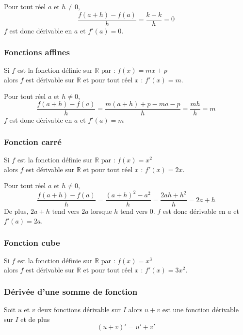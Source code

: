 \documentclass[french]{book}
\newcommand{\R}{\mathbb {R}}
\begin{document}
\begin{demo}
Pour tout réel $a$ et $h\neq 0$, 
\[\dfrac{f(a+h)-f(a)}{h}=\dfrac{k-k}{h}=0\]
$f$ est donc dérivable en $a$ et $f'(a)=0$.
\end{demo}

\subsubsection*{Fonctions affines}
\begin{prop}
Si $f$ est la fonction définie sur $\R$ par :  $f(x)=mx+p$ \\
alors $f$ est dérivable sur $\R$ et pour tout réel $x$ :  $f'(x)=m$.
\end{prop}

\begin{demo}
Pour tout réel $a$ et $h\neq 0$,
\[\dfrac{f(a+h)-f(a)}{h}=\dfrac{m(a+h)+p-ma-p}{h}=\dfrac{mh}{h}=m\]
$f$ est donc dérivable en $a$ et $f'(a)=m$
\end{demo}

\subsubsection*{Fonction carré}
\begin{prop}
Si $f$ est la fonction définie sur $\R$ par :  $f(x)=x^{2}$ \\
alors $f$ est dérivable sur $\R$ et pour tout réel $x$ :  $f'(x)=2x$.
\end{prop}

\begin{demo}
Pour tout réel $a$ et $h\neq 0$,
\[\dfrac{f(a+h)-f(a)}{h}=\dfrac{(a+h)^{2}-a^{2}}{h}=\dfrac{2ah+h^{2}}{h}=2a+h\]
De plus, $2a+h$ tend vers $2a$ lorsque $h$ tend vers 0.
$f$ est donc dérivable en $a$ et $f'(a)=2a$.
\end{demo}

\subsubsection*{Fonction cube}

\begin{prop}
Si $f$ est la fonction définie sur $\R$ par :  $f(x)=x^{3}$ \\
alors $f$ est dérivable sur $\R$ et pour tout réel $x$ :  $f'(x)=3x^{2}$.
\end{prop}

\subsubsection*{Dérivée d'une somme de fonction}
\begin{prop}
Soit $u$ et $v$ deux fonctions dérivable sur $I$ alors $u+v$ est une fonction dérivable sur $I$ et de plus $$(u+v)'=u'+v'$$
\end{prop}
\end{document}
